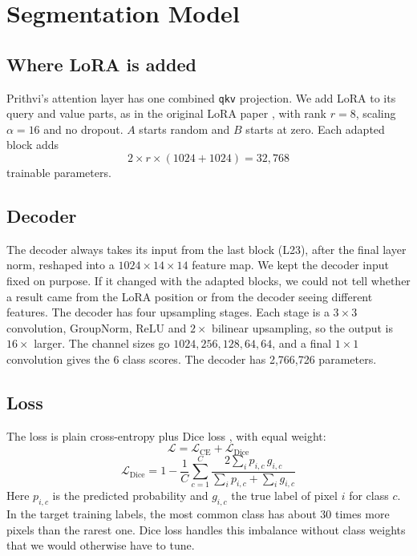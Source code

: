 \documentclass[11pt,a4paper]{report}
\begin{document}
\section{Segmentation Model}

\subsection{Where LoRA is added}

Prithvi's attention layer has one combined \texttt{qkv} projection. We add LoRA to its query and value parts, as in the original LoRA paper \cite{hu2022lora}, with rank $r = 8$, scaling $\alpha = 16$ and no dropout. $A$ starts random and $B$ starts at zero. Each adapted block adds
\begin{equation}
    2 \times r \times (1024 + 1024) = 32{,}768
\end{equation}
trainable parameters.

\subsection{Decoder}

The decoder always takes its input from the last block (L23), after the final layer norm, reshaped into a $1024 \times 14 \times 14$ feature map. We kept the decoder input fixed on purpose. If it changed with the adapted blocks, we could not tell whether a result came from the LoRA position or from the decoder seeing different features. The decoder has four upsampling stages. Each stage is a $3 \times 3$ convolution, GroupNorm, ReLU and $2\times$ bilinear upsampling, so the output is $16\times$ larger. The channel sizes go $1024, 256, 128, 64, 64$, and a final $1 \times 1$ convolution gives the 6 class scores. The decoder has 2,766,726 parameters.

\subsection{Loss}

The loss is plain cross-entropy plus Dice loss \cite{milletari2016vnet}, with equal weight:
\begin{equation}
    \mathcal{L} = \mathcal{L}_{\text{CE}} + \mathcal{L}_{\text{Dice}}
\end{equation}
\begin{equation}
    \mathcal{L}_{\text{Dice}} = 1 - \frac{1}{C}\sum_{c=1}^{C} \frac{2\sum_i p_{i,c}\, g_{i,c}}{\sum_i p_{i,c} + \sum_i g_{i,c}}
\end{equation}
Here $p_{i,c}$ is the predicted probability and $g_{i,c}$ the true label of pixel $i$ for class $c$. In the target training labels, the most common class has about 30 times more pixels than the rarest one. Dice loss handles this imbalance without class weights that we would otherwise have to tune.
\end{document}
